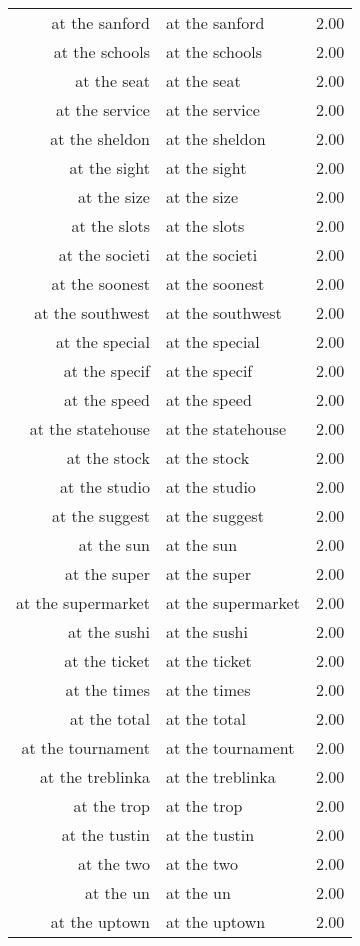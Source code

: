 \begin{table}[ht]
\begin{tabular}{rlr}
  at the sanford & at the sanford & 2.00 \\ 
  at the schools & at the schools & 2.00 \\ 
  at the seat & at the seat & 2.00 \\ 
  at the service & at the service & 2.00 \\ 
  at the sheldon & at the sheldon & 2.00 \\ 
  at the sight & at the sight & 2.00 \\ 
  at the size & at the size & 2.00 \\ 
  at the slots & at the slots & 2.00 \\ 
  at the societi & at the societi & 2.00 \\ 
  at the soonest & at the soonest & 2.00 \\ 
  at the southwest & at the southwest & 2.00 \\ 
  at the special & at the special & 2.00 \\ 
  at the specif & at the specif & 2.00 \\ 
  at the speed & at the speed & 2.00 \\ 
  at the statehouse & at the statehouse & 2.00 \\ 
  at the stock & at the stock & 2.00 \\ 
  at the studio & at the studio & 2.00 \\ 
  at the suggest & at the suggest & 2.00 \\ 
  at the sun & at the sun & 2.00 \\ 
  at the super & at the super & 2.00 \\ 
  at the supermarket & at the supermarket & 2.00 \\ 
  at the sushi & at the sushi & 2.00 \\ 
  at the ticket & at the ticket & 2.00 \\ 
  at the times & at the times & 2.00 \\ 
  at the total & at the total & 2.00 \\ 
  at the tournament & at the tournament & 2.00 \\ 
  at the treblinka & at the treblinka & 2.00 \\ 
  at the trop & at the trop & 2.00 \\ 
  at the tustin & at the tustin & 2.00 \\ 
  at the two & at the two & 2.00 \\ 
  at the un & at the un & 2.00 \\ 
  at the uptown & at the uptown & 2.00 \\ 

\end{tabular}
\end{table}
